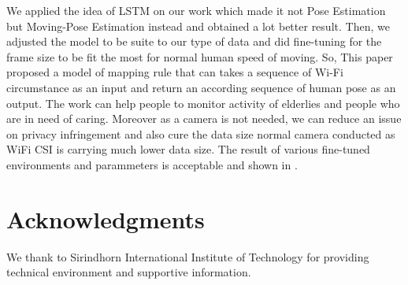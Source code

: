 \documentclass[10pt,letterpaper]{article}
\begin{document}
	
	We applied the idea of LSTM on our work which made it not Pose Estimation but Moving-Pose Estimation instead and obtained a lot better result. Then, we adjusted the model to be suite to our type of data and did fine-tuning for the frame size to be fit the most for normal human speed of moving. So, This paper proposed a model of mapping rule that can takes a sequence of Wi-Fi circumstance as an input and return an according sequence of human pose as an output. The work can help people to monitor activity of elderlies and people who are in need of caring. Moreover as a camera is not needed, we can reduce an issue on privacy infringement and also cure the data size normal camera conducted as WiFi CSI is carrying much lower data size.
	The result of various fine-tuned environments and parammeters is acceptable and shown in .
	

	\section*{Acknowledgments}
	We thank to Sirindhorn International Institute of Technology for providing technical environment and supportive information.
	
	
	
	\nolinenumbers
	
\end{document}

